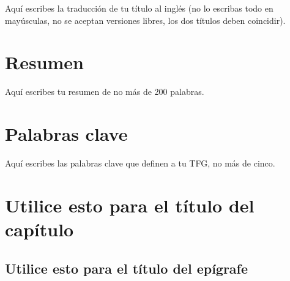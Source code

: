 \documentclass[13pt,a4paper]{report}
\begin{document}
Aquí escribes la traducción de tu título al inglés (no lo escribas todo en mayúsculas, no se aceptan versiones libres, los dos títulos deben coincidir).

\vspace{12pt}

\section{Resumen}

\vspace{12pt}

Aquí escribes tu resumen de no más de 200 palabras.

\vspace{12pt}

\section{Palabras clave}

\vspace{12pt}

Aquí escribes las palabras clave que definen a tu TFG, no más de cinco.

\newpage  


\section{Utilice esto para el título del capítulo} 

\subsection*{Utilice esto para el título del epígrafe} 
\end{document}
